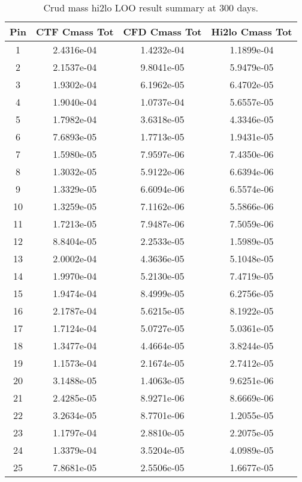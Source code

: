 \begin{table}[h]
    \begin{center}
        \caption[Hi2lo crud mass results]{Crud mass hi2lo LOO result summary at 300 days.}
    \begin{tabular}[h]{|c|c|c|c|}
        \hline
  Pin & CTF Cmass Tot & CFD Cmass Tot & Hi2lo Cmass Tot  \\
\hline
1  & 2.4316e-04 & 1.4232e-04 & 1.1899e-04 \\
2  & 2.1537e-04 & 9.8041e-05 & 5.9479e-05 \\
3  & 1.9302e-04 & 6.1962e-05 & 6.4702e-05 \\
4  & 1.9040e-04 & 1.0737e-04 & 5.6557e-05 \\
5  & 1.7982e-04 & 3.6318e-05 & 4.3346e-05 \\
6  & 7.6893e-05 & 1.7713e-05 & 1.9431e-05 \\
7  & 1.5980e-05 & 7.9597e-06 & 7.4350e-06 \\
8  & 1.3032e-05 & 5.9122e-06 & 6.6394e-06 \\
9  & 1.3329e-05 & 6.6094e-06 & 6.5574e-06 \\
10  & 1.3259e-05 & 7.1162e-06 & 5.5866e-06 \\
11  & 1.7213e-05 & 7.9487e-06 & 7.5059e-06 \\
12  & 8.8404e-05 & 2.2533e-05 & 1.5989e-05 \\
13  & 2.0002e-04 & 4.3636e-05 & 5.1048e-05 \\
14  & 1.9970e-04 & 5.2130e-05 & 7.4719e-05 \\
15  & 1.9474e-04 & 8.4999e-05 & 6.2756e-05 \\
16  & 2.1787e-04 & 5.6215e-05 & 8.1922e-05 \\
17  & 1.7124e-04 & 5.0727e-05 & 5.0361e-05 \\
18  & 1.3477e-04 & 4.4664e-05 & 3.8244e-05 \\
19  & 1.1573e-04 & 2.1674e-05 & 2.7412e-05 \\
20  & 3.1488e-05 & 1.4063e-05 & 9.6251e-06 \\
21  & 2.4285e-05 & 8.9271e-06 & 8.6669e-06 \\
22  & 3.2634e-05 & 8.7701e-06 & 1.2055e-05 \\
23  & 1.1797e-04 & 2.8810e-05 & 2.2075e-05 \\
24  & 1.3379e-04 & 3.5204e-05 & 4.0989e-05 \\
25  & 7.8681e-05 & 2.5506e-05 & 1.6677e-05 \\
\hline
\end{tabular}
\label{tab:loo_crud_cmass}
\end{center}
\end{table}

